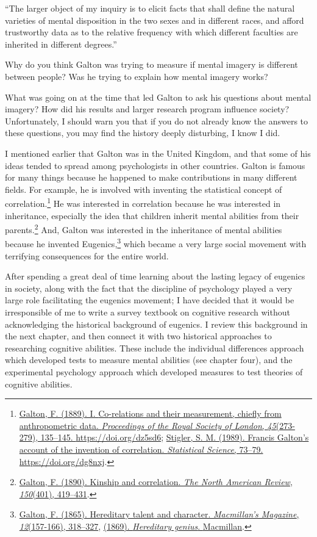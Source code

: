 \documentclass[
  oneside,
  12pt]{crumpbook}
\begin{document}
``The larger object of my inquiry is to elicit facts that shall define the natural varieties of mental disposition in the two sexes and in different races, and afford trustworthy data as to the relative frequency with which different faculties are inherited in different degrees.''

Why do you think Galton was trying to measure if mental imagery is different between people? Was he trying to explain how mental imagery works?

What was going on at the time that led Galton to ask his questions about mental imagery? How did his results and larger research program influence society? Unfortunately, I should warn you that if you do not already know the answers to these questions, you may find the history deeply disturbing, I know I did.

I mentioned earlier that Galton was in the United Kingdom, and that some of his ideas tended to spread among psychologists in other countries. Galton is famous for many things because he happened to make contributions in many different fields. For example, he is involved with inventing the statistical concept of correlation.\footnote{\protect\hyperlink{ref-galtonCorelationsTheirMeasurement1889}{Galton, F. (1889). I. {Co}-relations and their measurement, chiefly from anthropometric data. \emph{Proceedings of the Royal Society of London}, \emph{45}(273-279), 135--145. \url{https://doi.org/dz5sd6}}; \protect\hyperlink{ref-stiglerFrancisGaltonAccount1989}{Stigler, S. M. (1989). Francis {Galton}'s account of the invention of correlation. \emph{Statistical Science}, 73--79. \url{https://doi.org/dg8nxj}}.} He was interested in correlation because he was interested in inheritance, especially the idea that children inherit mental abilities from their parents.\footnote{\protect\hyperlink{ref-galtonKinshipCorrelation1890}{Galton, F. (1890). Kinship and correlation. \emph{The North American Review}, \emph{150}(401), 419--431}.} And, Galton was interested in the inheritance of mental abilities because he invented Eugenics,\footnote{\protect\hyperlink{ref-galtonHereditaryTalentCharacter1865}{Galton, F. (1865). Hereditary talent and character. \emph{Macmillan's Magazine}, \emph{12}(157-166), 318--327}, \protect\hyperlink{ref-galtonHereditaryGenius1869}{(1869). \emph{Hereditary genius}. {Macmillan}}.} which became a very large social movement with terrifying consequences for the entire world.

After spending a great deal of time learning about the lasting legacy of eugenics in society, along with the fact that the discipline of psychology played a very large role facilitating the eugenics movement; I have decided that it would be irresponsible of me to write a survey textbook on cognitive research without acknowledging the historical background of eugenics. I review this background in the next chapter, and then connect it with two historical approaches to researching cognitive abilities. These include the individual differences approach which developed tests to measure mental abilities (see chapter four), and the experimental psychology approach which developed measures to test theories of cognitive abilities.
\end{document}
